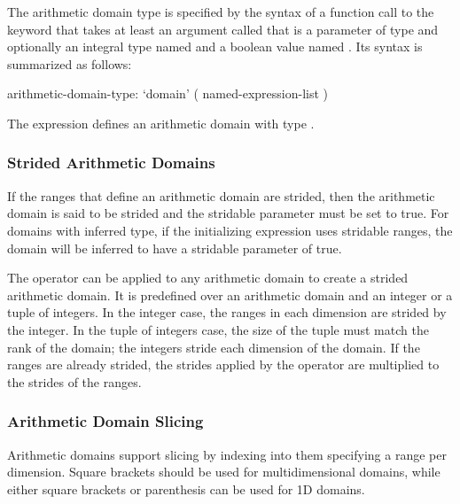 The arithmetic domain type is specified by the syntax of a function
call to the keyword  that takes at least an argument
called  that is a parameter of type  and
optionally an integral type named  and a boolean value
named .  Its syntax is summarized as follows:
\begin{syntax}
arithmetic-domain-type:
  `domain' ( named-expression-list )
\end{syntax}

\begin{example}
The expression \chpl{[1..5, 1..5]} defines an arithmetic domain with
type .
\end{example}

\subsubsection{Strided Arithmetic Domains}
\label{Strided_Arithmetic_Domains_and_Arrays}

If the ranges that define an arithmetic domain are strided, then the
arithmetic domain is said to be strided and the stridable parameter
must be set to true.  For domains with inferred type, if the
initializing expression uses stridable ranges, the domain will be
inferred to have a stridable parameter of true.

The  operator can be applied to any arithmetic domain to
create a strided arithmetic domain.  It is predefined over an
arithmetic domain and an integer or a tuple of integers.  In the
integer case, the ranges in each dimension are strided by the integer.
In the tuple of integers case, the size of the tuple must match the
rank of the domain; the integers stride each dimension of the domain.
If the ranges are already strided, the strides applied by
the  operator are multiplied to the strides of the ranges.

\subsubsection{Arithmetic Domain Slicing}
\label{Arithmetic_Domain_Slicing}

Arithmetic domains support slicing by indexing into them specifying a
range per dimension.  Square brackets should be used for
multidimensional domains, while either square brackets or parenthesis
can be used for 1D domains.  

